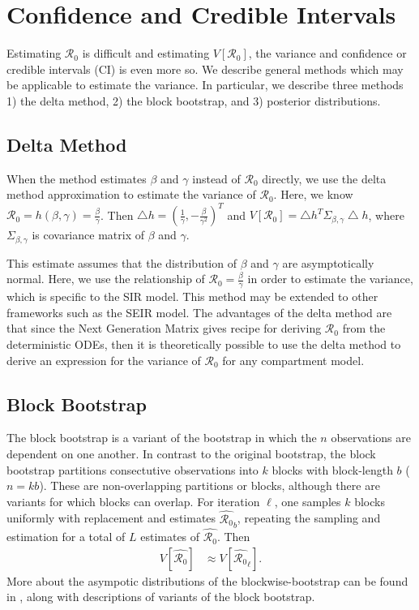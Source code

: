 \documentclass[12pt]{article}
\newcommand{\rr}{\ensuremath{\mathcal{R}_0}}
\begin{document}
\section{Confidence and Credible Intervals}
\label{sec:ci}

Estimating $\rr$ is difficult and estimating $V[\rr]$, the variance and confidence or credible intervals (CI) is even more so.  We describe general methods which may be applicable to estimate the variance.  In particular, we describe three methods 1) the delta method, 2) the block bootstrap, and 3) posterior distributions.




\subsection{Delta Method}\label{delta-method}

When the method estimates \(\beta\) and \(\gamma\) instead of \(\rr\) directly, we use the delta method approximation to estimate the
variance of \(\rr\). Here, we know \(\rr = h(\beta, \gamma) = \frac{\beta}{\gamma}\). Then \(\bigtriangleup h = (\frac{1}{\gamma},  -\frac{\beta}{\gamma^2})^T\) and \(V[\rr] = \bigtriangleup h^T \Sigma_{\beta, \gamma} \bigtriangleup h\), where \(\Sigma_{\beta, \gamma}\) is covariance matrix of \(\beta\) and \(\gamma\).

This estimate assumes that the distribution of $\beta$ and $\gamma$ are asymptotically normal.  Here, we use the relationship of $\rr = \frac{\beta}{\gamma}$ in order to estimate the variance, which is specific to the SIR model.  This method may be extended to other frameworks such as the SEIR model.  The advantages of the delta method are that since the Next Generation Matrix \citep{diekmann2009} gives recipe for deriving $\rr$ from the deterministic ODEs, then it is theoretically possible to use the delta method to derive an expression for the variance of $\rr$ for any compartment model.

\subsection{Block Bootstrap}

The block bootstrap is a variant of the bootstrap in which the $n$ observations are dependent on one another.  In contrast to the original bootstrap, the block bootstrap partitions consectutive observations into $k$ blocks with block-length $b$ ($n=kb$).  These are non-overlapping partitions or blocks, although there are variants for which blocks can overlap.  For iteration $\ell$, one samples $k$ blocks uniformly with replacement and estimates $\hat{\rr}_b$, repeating the sampling and estimation for a total of $L$ estimates of $\hat{\rr}$.  Then
\begin{align*}
  V\left [ \hat{\rr} \right ] &\approx V\left [\hat{\rr}_\ell \right ].
\end{align*}
More about the asympotic distributions of the blockwise-bootstrap can be found in \cite{cao1999}, along with descriptions of variants of the block bootstrap.
\end{document}
